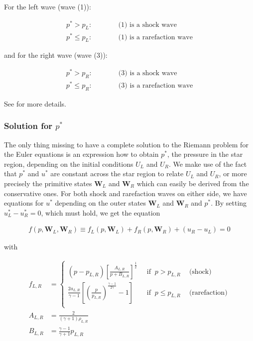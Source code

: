 For the left wave (wave (1)):

\begin{align}
	p^* > p_L: && &\quad \text{ (1) is a shock wave}\\
	p^* \leq p_L: && &\quad \text{ (1) is a rarefaction wave}
\end{align}

and for the right wave (wave (3)):

\begin{align}
	p^* > p_R: && & \quad \text{ (3) is a shock wave} \\
	p^* \leq p_R: && & \quad \text{ (3) is a rarefaction wave} 
\end{align}

See \cite{toro} for more details.










\subsubsection{Solution for $p^*$}

The only thing missing to have a complete solution to the Riemann problem for the Euler equations is an expression how to obtain $p^*$, the pressure in the star region, depending on the initial conditions $U_L$ and $U_R$.
We make use of the fact that $p^*$ and $u^*$ are constant across the star region to relate $U_L$ and $U_R$, or more precisely the primitive states $\mathbf{W}_L$ and $\mathbf{W}_R$ which can easily be derived from the conservative ones.
For both shock and rarefaction waves on either side, we have equations for $u^*$ depending on the outer states  $\mathbf{W}_L$ and $\mathbf{W}_R$ and $p^*$.
By setting $u^*_L - u^*_R = 0$, which must hold, we get the equation

\begin{align}
	f(p, \mathbf{W}_L, \mathbf{W}_R) \equiv f_L(p, \mathbf{W}_L) + f_R(p, \mathbf{W}_R) + (u_R - u_L) = 0
\end{align}

with 

\begin{align}
	f_{L,R} &= 
		\begin{cases}
			(p - p_{L,R}) \left[ \frac{A_{L,R}}{p + B_{L,R}} \right]^{\frac{1}{2}}
				& ~\text{ if } ~ p > p_{L,R} ~ \quad \text{(shock)} \\
			\frac{2 a_{L,R}}{\gamma - 1} \left[ \left( \frac{p}{p_{L,R}} \right)^ \frac{\gamma -1}{2 \gamma} - 1 \right]
				& ~\text{ if } ~ p \leq p_{L,R} ~ \quad \text{(rarefaction)}\\
		\end{cases} \\
	A_{L,R} &= 
		\frac{2}{(\gamma + 1) \rho_{L,R}}\\
	B_{L,R} &= 
		\frac{\gamma - 1}{\gamma + 1} p_{L,R}
\end{align}











